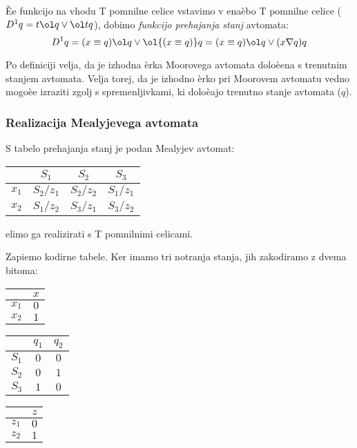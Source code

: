 \begin{zgled}
Èe funkcijo na vhodu T pomnilne celice vstavimo v enaèbo T pomnilne celice ($D^1 q = t \ol q \vee \ol t q$), dobimo \emph{funkcijo prehajanja stanj} avtomata:
$$
D^1q = (x \equiv q) \ol q \vee \ol{(x \equiv q)} q = (x \equiv q) \ol q \vee (x \nabla q) q 
$$ 

Po definiciji velja, da je izhodna èrka Moorovega avtomata doloèena s trenutnim stanjem avtomata. Velja torej, da je izhodno èrko pri Moorovem avtomatu vedno mogoèe izraziti zgolj s spremenljivkami, ki doloèajo trenutno stanje avtomata ($q$).


\subsubsection{Realizacija Mealyjevega avtomata}

S tabelo prehajanja stanj je podan Mealyjev avtomat:

\bigskip

\begin{tabular}{c|ccc}
 & $S_1$ & $S_2$ & $S_3$\\
\hline
$x_1$ & $S_2 / z_1$ & $S_2 / z_2$ & $S_1 / z_1$\\
$x_2$ & $S_1 / z_2$ & $S_3 / z_1$ & $S_3/ z_2$ \\
\end{tabular}

\bigskip

elimo ga realizirati s T pomnilnimi celicami.

\bigskip

Zapiemo kodirne tabele. Ker imamo tri notranja stanja, jih zakodiramo z dvema bitoma:

\bigskip

\begin{tabular}{c|c}
 & $x$ \\ 
\hline
$x_1$ & $0$\\
$x_2$ & $1$\\
\end{tabular}

\bigskip

\begin{tabular}{c|cc}
 & $q_1$ & $q_2$ \\ 
\hline
$S_1$ & $0$ & $0$\\
$S_2$ & $0$ & $1$\\
$S_3$ & $1$ & $0$\\
\end{tabular}

\bigskip

\begin{tabular}{c|c}
 & $z$ \\ 
\hline
$z_1$ & $0$\\
$z_2$ & $1$\\
\end{tabular}


\end{zgled}
